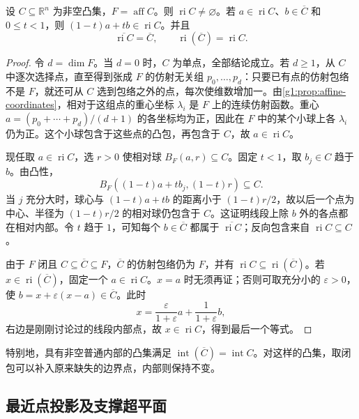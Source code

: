 \begin{proposition}\label{g1:prop:relative-interior}
	设 \(C\subseteq\mathbb R^n\) 为非空凸集，\(F=\operatorname{aff}C\)。则 \(\operatorname{ri}C\ne\varnothing\)。若 \(a\in\operatorname{ri}C\)、\(b\in\overline C\) 和 \(0\leq t<1\)，则 \((1-t)a+tb\in\operatorname{ri}C\)。并且
	\[
		\overline{\operatorname{ri}C}=\overline C,\qquad
		\operatorname{ri}(\overline C)=\operatorname{ri}C.
	\]
\end{proposition}
\begin{proof}
	令 \(d=\dim F\)。当 \(d=0\) 时，\(C\) 为单点，全部结论成立。若 \(d\geq1\)，从 \(C\) 中逐次选择点，直至得到张成 \(F\) 的仿射无关组 \(p_0,\ldots,p_d\)：只要已有点的仿射包络不是 \(F\)，就还可从 \(C\) 选到包络之外的点，每次使维数增加一。由\cref{g1:prop:affine-coordinates}，相对于这组点的重心坐标 \(\lambda_i\) 是 \(F\) 上的连续仿射函数。重心 \(a=(p_0+\cdots+p_d)/(d+1)\) 的各坐标均为正，因此在 \(F\) 中的某个小球上各 \(\lambda_i\) 仍为正。这个小球包含于这些点的凸包，再包含于 \(C\)，故 \(a\in\operatorname{ri}C\)。

	现任取 \(a\in\operatorname{ri}C\)，选 \(r>0\) 使相对球 \(B_F(a,r)\subseteq C\)。固定 \(t<1\)，取 \(b_j\in C\) 趋于 \(b\)。由凸性，
	\[
		B_F((1-t)a+tb_j,(1-t)r)\subseteq C.
	\]
	当 \(j\) 充分大时，球心与 \((1-t)a+tb\) 的距离小于 \((1-t)r/2\)，故以后一个点为中心、半径为 \((1-t)r/2\) 的相对球仍包含于 \(C\)。这证明线段上除 \(b\) 外的各点都在相对内部。令 \(t\) 趋于 \(1\)，可知每个 \(b\in\overline C\) 都属于 \(\overline{\operatorname{ri}C}\)；反向包含来自 \(\operatorname{ri}C\subseteq C\)。

	由于 \(F\) 闭且 \(C\subseteq\overline C\subseteq F\)，\(\overline C\) 的仿射包络仍为 \(F\)，并有 \(\operatorname{ri}C\subseteq\operatorname{ri}(\overline C)\)。若 \(x\in\operatorname{ri}(\overline C)\)，固定一个 \(a\in\operatorname{ri}C\)。\(x=a\) 时无须再证；否则可取充分小的 \(\varepsilon>0\)，使 \(b=x+\varepsilon(x-a)\in\overline C\)。此时
	\[
		x=\frac{\varepsilon}{1+\varepsilon}a+\frac{1}{1+\varepsilon}b,
	\]
	右边是刚刚讨论过的线段内部点，故 \(x\in\operatorname{ri}C\)，得到最后一个等式。
\end{proof}

特别地，具有非空普通内部的凸集满足 \(\operatorname{int}(\overline C)=\operatorname{int}C\)。对这样的凸集，取闭包可以补入原来缺失的边界点，内部则保持不变。

\subsection{最近点投影及支撑超平面}
\label{g1:subsec:0301:02}

